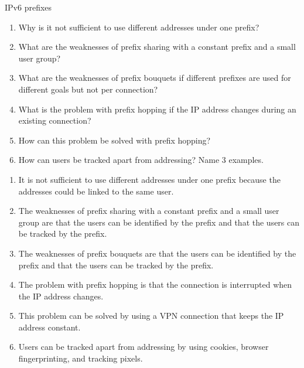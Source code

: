 \documentclass{article}
\begin{document}
\begin{exercise}{IPv6 prefixes}
  \begin{enumerate}
    \item Why is it not sufficient to use different addresses under one prefix?
    \item What are the weaknesses of prefix sharing with a constant prefix and a small user group?
    \item What are the weaknesses of prefix bouquets if different prefixes are used for different goals but not per connection?
    \item What is the problem with prefix hopping if the IP address changes during an existing connection?
    \item How can this problem be solved with prefix hopping?
    \item How can users be tracked apart from addressing? Name 3 examples.
  \end{enumerate}

  \begin{solution}
    \begin{enumerate}
      \item It is not sufficient to use different addresses under one prefix because the addresses could be linked to the same user.
      \item The weaknesses of prefix sharing with a constant prefix and a small user group are that the users can be identified by the prefix and that the users can be tracked by the prefix.
      \item The weaknesses of prefix bouquets are that the users can be identified by the prefix and that the users can be tracked by the prefix.
      \item The problem with prefix hopping is that the connection is interrupted when the IP address changes.
      \item This problem can be solved by using a VPN connection that keeps the IP address constant.
      \item Users can be tracked apart from addressing by using cookies, browser fingerprinting, and tracking pixels.
    \end{enumerate}
  \end{solution}
\end{exercise}
\end{document}
